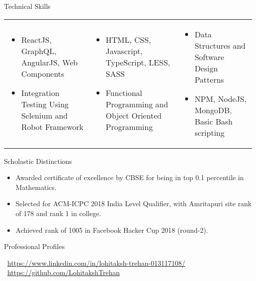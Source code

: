 \documentclass[]{format}
\begin{document}
	\vspace{-5pt}

	\begin{cvsection}{Technical Skills}
	\vspace{-6pt}
	\hspace{1.925pt}
		\begin{tabu} to 1\textwidth { X[l,p] X[l,p] X[0.7l,p] }
			\begin{itemize}
			    \item ReactJS, GraphQL, AngularJS, Web Components
			    \item Integration Testing Using Selenium and Robot Framework
			\end{itemize} & \begin{itemize}
			    \item HTML, CSS, Javascript, TypeScript, LESS, SASS
			    \item Functional Programming and Object Oriented Programming
			\end{itemize} & \begin{itemize}
			    \item Data Structures and Software Design Patterns
			    \item NPM, NodeJS, MongoDB, Basic Bash scripting
			\end{itemize}
		\end{tabu}
	\end{cvsection}
	
	\vspace{-20pt}
	
	\begin{cvsection}{Scholastic Distinctions}
	\vspace{2pt}
		\begin{cvsubsection}{}{}{}	
			\begin{itemize}
				\item Awarded certificate of excellence by CBSE for being in top 0.1 percentile in Mathematics.
                \item Selected for ACM-ICPC 2018 India Level Qualifier, with Amritapuri site rank of 178 and rank 1 in college.
                \item Achieved rank of 1005 in Facebook Hacker Cup 2018 (round-2).
			\end{itemize}
		\end{cvsubsection}
	\end{cvsection}
	
	\vspace{-5pt}
	
	\begin{cvsection}{Professional Profiles}
	    \vspace{2pt}
	    \begin{cvsubsection}{}{}{}
	    \textbullet\ \small{\url{https://www.linkedin.com/in/lohitaksh-trehan-013117108/}} \hfill \textbullet\ \small{\url{https://github.com/LohitakshTrehan}}
	    \end{cvsubsection}
	\end{cvsection}
	
\end{document}
